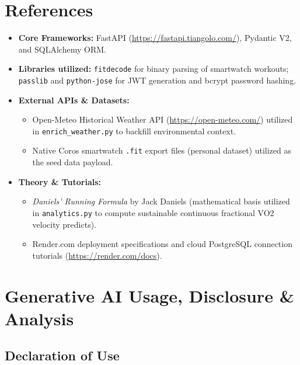 \documentclass[10pt,a4paper]{article}
\begin{document}
\section{References}

\begin{itemize}[leftmargin=1.5em]
    \item \textbf{Core Frameworks:} FastAPI (\url{https://fastapi.tiangolo.com/}), Pydantic V2, and SQLAlchemy ORM.
    \item \textbf{Libraries utilized:} \texttt{fitdecode} for binary parsing of smartwatch workouts; \texttt{passlib} and \texttt{python-jose} for JWT generation and bcrypt password hashing.
    \item \textbf{External APIs \& Datasets:}
    \begin{itemize}[label=$\circ$]
        \item Open-Meteo Historical Weather API (\url{https://open-meteo.com/}) utilized in \texttt{enrich\_weather.py} to backfill environmental context.
        \item Native Coros smartwatch \texttt{.fit} export files (personal dataset) utilized as the seed data payload.
    \end{itemize}
    \item \textbf{Theory \& Tutorials:}
    \begin{itemize}[label=$\circ$]
        \item \textit{Daniels' Running Formula} by Jack Daniels (mathematical basis utilized in \texttt{analytics.py} to compute sustainable continuous fractional VO2 velocity predicts).
        \item Render.com deployment specifications and cloud PostgreSQL connection tutorials (\url{https://render.com/docs}).
    \end{itemize}
\end{itemize}

\appendix
\section{Generative AI Usage, Disclosure \& Analysis}

\subsection{Declaration of Use}
\end{document}
